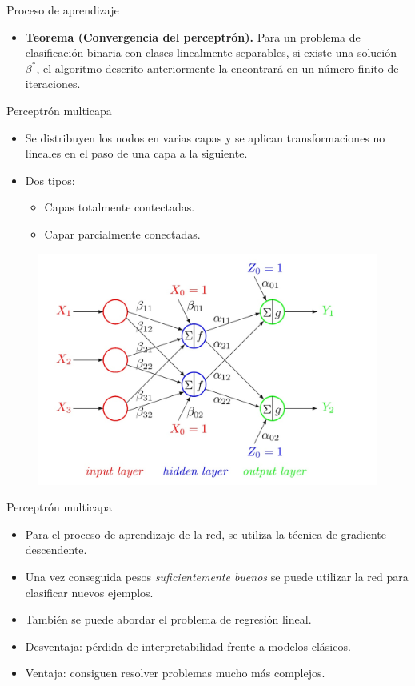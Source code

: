 \documentclass[spanish]{beamer}
\begin{document}
\begin{frame}{Proceso de aprendizaje}
  \begin{itemize}
    \item \textbf{Teorema (Convergencia del perceptrón). } Para un problema de clasificación binaria con clases linealmente separables, si existe una solución $\beta^\ast$, el algoritmo descrito anteriormente la encontrará en un número finito de iteraciones.
  \end{itemize}
\end{frame}

\begin{frame}{Perceptrón multicapa}
  \begin{itemize}
    \item Se distribuyen los nodos en varias capas y se aplican transformaciones no lineales en el paso de una capa a la siguiente.
    \item Dos tipos:
    \begin{itemize}
      \item Capas totalmente contectadas.
      \item Capar parcialmente conectadas.
    \end{itemize}
  \end{itemize}
  \begin{figure}[h]
    \centering
    \includegraphics[width=.7\textwidth]{img/multicapa}
  \end{figure}
\end{frame}

\begin{frame}{Perceptrón multicapa}
  \begin{itemize}
    \item Para el proceso de aprendizaje de la red, se utiliza la técnica de gradiente descendente.
    \item Una vez conseguida pesos \textit{suficientemente buenos} se puede utilizar la red para clasificar nuevos ejemplos.
    \item También se puede abordar el problema de regresión lineal.
    \item Desventaja: pérdida de interpretabilidad frente a modelos clásicos.
    \item Ventaja: consiguen resolver problemas mucho más complejos.
  \end{itemize}
\end{frame}
\end{document}
